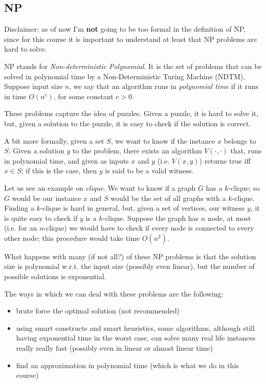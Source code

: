 \subsection{NP}
    Disclaimer: as of now I'm \textbf{not} going to be too formal in the definition of NP, since for this course it is important to understand at least that NP problems are hard to solve.

    NP stands for \textit{Non-deterministic Polynomial}.
    It is the set of problems that can be solved in polynomial time by a Non-Deterministic Turing Machine (NDTM).
    Suppose input size $n$, we say that an algorithm runs in \textit{polynomial time} if it runs in time $O(n^c)$, for some constant $c > 0$.

    These problems capture the idea of puzzles. Given a puzzle, it is hard to solve it, but, given a solution to the puzzle, it is easy to check if the solution is correct.

    A bit more formally, given a set $S$, we want to know if the instance $x$ belongs to $S$. Given a solution $y$ to the problem, there exists an algorithm $V(\cdot, \cdot)$ that, runs in polynomial time, and given as inputs $x$ and $y$ (i.e. $V(x,y)$) returns true iff $x \in S$; if this is the case, then $y$ is said to be a valid witness.

    Let us see an example on \textit{clique}.
    We want to know if a graph $G$ has a $k$-clique; so $G$ would be our instance $x$ and $S$ would be the set of all graphs with a $k$-clique.
    Finding a $k$-clique is hard in general, but, given a set of vertices, our witness $y$, it is quite easy to check if $y$ is a $k$-clique.
    Suppose the graph has $n$ node, at most (i.e. for an $n$-clique) we would have to check if every node is connected to every other node; this procedure would take time $O(n^2)$.

    What happens with many (if not all?) of these NP problems is that the solution size is polynomial w.r.t. the input size (possibly even linear), but the number of possible solutions is exponential.

    The ways in which we can deal with these problems are the following:
    \begin{itemize}
        \item brute force the optimal solution (not recommended)
        \item using smart constructs and smart heuristics, some algorithms, although still having exponential time in the worst case, can solve many real life instances really really fast (possibly even in linear or almost linear time)
        \item find an approximation in polynomial time (which is what we do in this course)
    \end{itemize}

